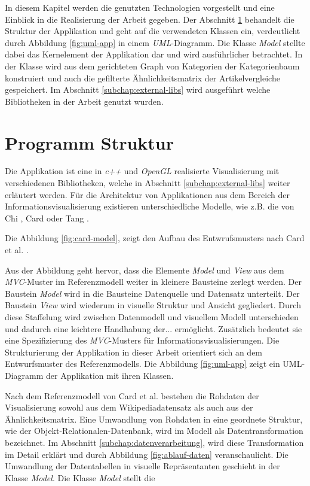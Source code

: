 In diesem Kapitel werden die genutzten Technologien vorgestellt und eine Einblick in die Realisierung der Arbeit gegeben.
Der Abschnitt \ref{subchap:app-struct} behandelt die Struktur der Applikation und geht auf die verwendeten Klassen ein, verdeutlicht durch Abbildung \ref{fig:uml-app} in einem \emph{UML}-Diagramm.
Die Klasse \emph{Model} stellte dabei das Kernelement der Applikation dar und wird ausführlicher betrachtet.
In der Klasse wird aus dem gerichteten Graph von Kategorien der Kategorienbaum konstruiert und auch die gefilterte Ähnlichkeitsmatrix der Artikelvergleiche gespeichert.
Im Abschnitt \ref{subchap:external-libs} wird ausgeführt welche Bibliotheken in der Arbeit genutzt wurden.


\section{Programm Struktur}\label{subchap:app-struct}

Die Applikation ist eine in \emph{c++} und \emph{OpenGL} realisierte Visualisierung mit verschiedenen Bibliotheken, welche in Abschnitt \ref{subchap:external-libs} weiter erläutert werden.
Für die Architektur von Applikationen aus dem Bereich der Informationsvisualisierung existieren unterschiedliche Modelle, wie z.B. die von Chi \cite{EdHuaiHsinChi}, Card \cite{card1999readings} oder Tang \cite{Tang2004}.

Die Abbildung \ref{fig:card-model}, zeigt den Aufbau des Entwrufsmusters nach Card et al. \cite{card1999readings}.


Aus der Abbildung geht hervor, dass die Elemente \emph{Model} und \emph{View} aus dem \emph{MVC}-Muster im Referenzmodell weiter in kleinere Bausteine zerlegt werden.
Der Baustein \emph{Model} wird in die Bausteine Datenquelle und Datensatz unterteilt.
Der Baustein \emph{View} wird wiederum in visuelle Struktur und Ansicht gegliedert.
Durch diese Staffelung wird zwischen Datenmodell und visuellem Modell unterschieden und dadurch eine leichtere Handhabung der... ermöglicht.
Zusätzlich bedeutet sie eine Spezifizierung des \emph{MVC}-Musters für Informationsvisualisierungen.
Die Strukturierung der Applikation in dieser Arbeit orientiert sich an dem Entwurfsmuster des Referenzmodells.
Die Abbildung \ref{fig:uml-app} zeigt ein UML-Diagramm der Applikation mit ihren Klassen.

Nach dem Referenzmodell von Card et al. \cite{card1999readings} bestehen die Rohdaten der Visualisierung sowohl aus dem Wikipediadatensatz als auch aus der Ähnlichkeitsmatrix.
Eine Umwandlung von Rohdaten in eine geordnete Struktur, wie der Objekt-Relationalen-Datenbank, wird im Modell als Datentransformation bezeichnet.
Im Abschnitt \ref{subchap:datenverarbeitung}, wird diese Transformation im Detail erklärt und durch Abbildung \ref{fig:ablauf-daten} veranschaulicht.
Die Umwandlung der Datentabellen in visuelle Repräsentanten geschieht in der Klasse \emph{Model}.
Die Klasse \emph{Model} stellt die 

